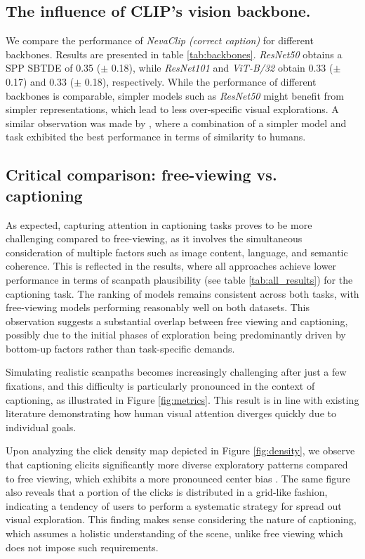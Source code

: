 \documentclass{article}
\begin{document}
\subsection{The influence of CLIP's vision backbone.} We compare the performance of \textit{NevaClip (correct caption)} for different backbones. Results are presented in table \ref{tab:backbones}.  \textit{ResNet50} obtains a SPP SBTDE of 0.35 ($\pm$ 0.18), while \textit{ResNet101} and \textit{ViT-B/32} obtain 0.33 ($\pm$ 0.17) and 0.33 ($\pm$ 0.18), respectively. While the performance of different backbones is comparable, simpler models such as \textit{ResNet50} might benefit from simpler representations, which lead to less over-specific visual explorations. A similar observation was made by  \citet{schwinn2022behind}, where a combination of a simpler model and task exhibited the best performance in terms of similarity to humans.



\subsection{Critical comparison: free-viewing vs. captioning} \label{sec:captioningVSfreeviewing}

As expected, capturing attention in captioning tasks proves to be more challenging compared to free-viewing, as it involves the simultaneous consideration of multiple factors such as image content, language, and semantic coherence. This is reflected in the results, where all approaches achieve lower performance in terms of scanpath plausibility (see table \ref{tab:all_results}) for the captioning task. The ranking of models remains consistent across both tasks, with free-viewing models performing reasonably well on both datasets. This observation suggests a substantial overlap between free viewing and captioning, possibly due to the initial phases of exploration being predominantly driven by bottom-up factors rather than task-specific demands.

Simulating realistic scanpaths becomes increasingly challenging after just a few fixations, and this difficulty is particularly pronounced in the context of captioning, as illustrated in Figure \ref{fig:metrics}. This result is in line with existing literature \citep{tatler2005visual} demonstrating how human visual attention diverges quickly due to individual goals.

Upon analyzing the click density map depicted in Figure \ref{fig:density}, we observe that captioning elicits significantly more diverse exploratory patterns compared to free viewing, which exhibits a more pronounced center bias \citep{judd2009learning}. The same figure also reveals that a portion of the clicks is distributed in a grid-like fashion, indicating a tendency of users to perform a systematic  strategy for spread out visual exploration. This finding makes sense considering the nature of captioning, which assumes a holistic understanding of the scene, unlike free viewing which does not impose such requirements. 
\end{document}
